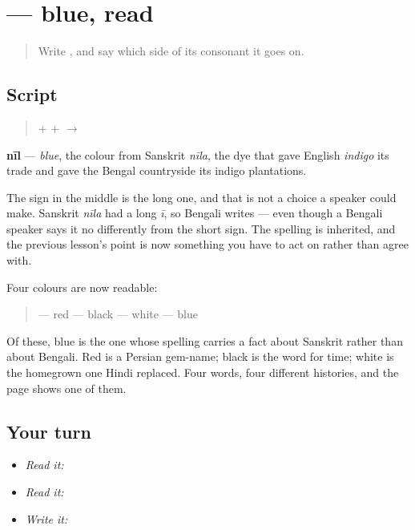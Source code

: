 \section[nīl]{ — blue, read}

\label{lesson:BN-W04-nil-read}



\begin{quote}
Write \textbf{}, and say which side of its consonant it goes on.
\end{quote}

\subsection*{Script}
\begin{quote}
\textbf{} + \textbf{} + \textbf{} $\to$ \textbf{}
\end{quote}

\textbf{nīl} — \emph{blue}, the colour from Sanskrit \emph{nīla}, the dye that gave English \emph{indigo} its trade and gave the Bengal countryside its indigo plantations.

The sign in the middle is the long one, and that is not a choice a speaker could make. Sanskrit \emph{nīla} had a long \emph{ī}, so Bengali writes \textbf{} — even though a Bengali speaker says it no differently from the short sign. The spelling is inherited, and the previous lesson's point is now something you have to act on rather than agree with.

Four colours are now readable:

\begin{quote}
\textbf{} — red \textbf{} — black \textbf{} — white \textbf{} — blue
\end{quote}

Of these, blue is the one whose spelling carries a fact about Sanskrit rather than about Bengali. Red is a Persian gem-name; black is the word for time; white is the homegrown one Hindi replaced. Four words, four different histories, and the page shows one of them.

\subsection*{Your turn}
\begin{itemize}
\raggedright
  \item \emph{Read it:} 
  \item \emph{Read it:}    
  \item \emph{Write it:} 
\end{itemize}

